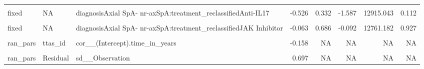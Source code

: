 \begin{table}[!h]
\begin{tabular}[t]{lllrrrrr}
\cellcolor{gray!10}{fixed} & \cellcolor{gray!10}{NA} & \cellcolor{gray!10}{time\_in\_years} & \cellcolor{gray!10}{0.004} & \cellcolor{gray!10}{0.005} & \cellcolor{gray!10}{0.867} & \cellcolor{gray!10}{1697.795} & \cellcolor{gray!10}{0.386}\\
\addlinespace
fixed & NA & diagnosisAxial SpA- nr-axSpA:treatment\_reclassifiedAnti-IL17 & -0.526 & 0.332 & -1.587 & 12915.043 & 0.112\\
\cellcolor{gray!10}{fixed} & \cellcolor{gray!10}{NA} & \cellcolor{gray!10}{diagnosisAxial SpA- nr-axSpA:treatment\_reclassifiedAnti-TNF} & \cellcolor{gray!10}{-0.194} & \cellcolor{gray!10}{0.133} & \cellcolor{gray!10}{-1.462} & \cellcolor{gray!10}{10257.270} & \cellcolor{gray!10}{0.144}\\
fixed & NA & diagnosisAxial SpA- nr-axSpA:treatment\_reclassifiedJAK Inhibitor & -0.063 & 0.686 & -0.092 & 12761.182 & 0.927\\
\cellcolor{gray!10}{ran\_pars} & \cellcolor{gray!10}{ttas\_id} & \cellcolor{gray!10}{sd\_\_(Intercept)} & \cellcolor{gray!10}{1.640} & \cellcolor{gray!10}{NA} & \cellcolor{gray!10}{NA} & \cellcolor{gray!10}{NA} & \cellcolor{gray!10}{NA}\\
ran\_pars & ttas\_id & cor\_\_(Intercept).time\_in\_years & -0.158 & NA & NA & NA & NA\\
\addlinespace
\cellcolor{gray!10}{ran\_pars} & \cellcolor{gray!10}{ttas\_id} & \cellcolor{gray!10}{sd\_\_time\_in\_years} & \cellcolor{gray!10}{0.061} & \cellcolor{gray!10}{NA} & \cellcolor{gray!10}{NA} & \cellcolor{gray!10}{NA} & \cellcolor{gray!10}{NA}\\
ran\_pars & Residual & sd\_\_Observation & 0.697 & NA & NA & NA & NA\\
\bottomrule
\end{tabular}
\end{table}
